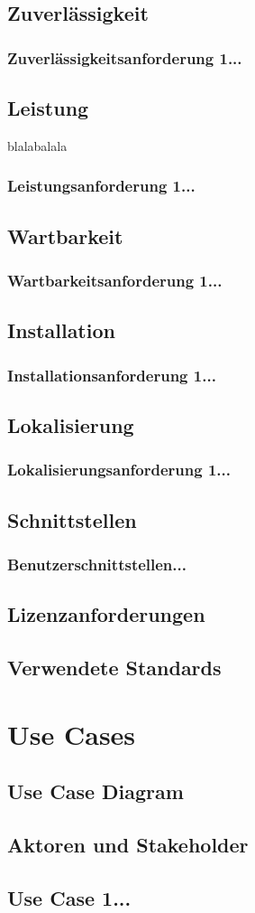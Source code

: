 \documentclass[12pt,a4paper,onecolumn]{article}
\begin{document}
\subsection{Zuverlässigkeit}
\subsubsection{Zuverlässigkeitsanforderung 1...}
\subsection{Leistung}blalabalala
\subsubsection{Leistungsanforderung 1...}
\subsection{Wartbarkeit}
\subsubsection{Wartbarkeitsanforderung 1...}
\subsection{Installation}
\subsubsection{Installationsanforderung 1...}
\subsection{Lokalisierung}
\subsubsection{Lokalisierungsanforderung 1...}
\subsection{Schnittstellen}
\subsubsection{Benutzerschnittstellen...}
\subsection{Lizenzanforderungen}
\subsection{Verwendete Standards}

\section{Use Cases}
\subsection{Use Case Diagram}
\subsection{Aktoren und Stakeholder}
\subsection{Use Case 1...}
\end{document}
